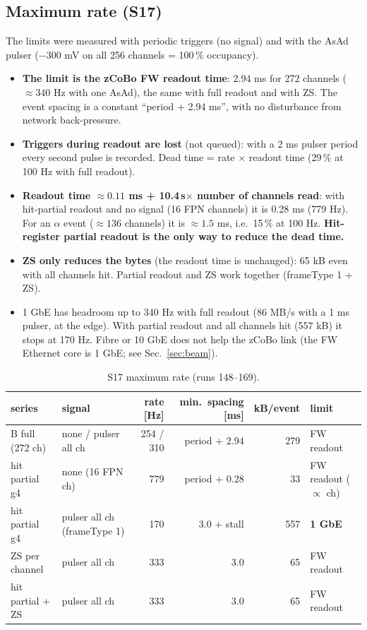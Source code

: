 \documentclass[a4paper,11pt]{article}
\newcommand{\us}{\,\textmu s}
\begin{document}
\subsection{Maximum rate (S17)}
The limits were measured with periodic triggers (no signal) and with the AsAd pulser ($-300$ mV on all 256 channels = 100\,\% occupancy).
\begin{itemize}
\item \textbf{The limit is the zCoBo FW readout time}: 2.94 ms for 272 channels ($\approx 340$ Hz with one AsAd), the same with full readout and with ZS. The event spacing is a constant ``period + 2.94 ms'', with no disturbance from network back-pressure.
\item \textbf{Triggers during readout are lost} (not queued): with a 2 ms pulser period every second pulse is recorded. Dead time = rate $\times$ readout time (29\,\% at 100 Hz with full readout).
\item \textbf{Readout time $\approx 0.11$ ms + 10.4\us $\times$ number of channels read}: with hit-partial readout and no signal (16 FPN channels) it is 0.28 ms (779 Hz). For an $\alpha$ event ($\approx 136$ channels) it is $\approx 1.5$ ms, i.e.\ 15\,\% at 100 Hz. \textbf{Hit-register partial readout is the only way to reduce the dead time.}
\item \textbf{ZS only reduces the bytes} (the readout time is unchanged): 65 kB even with all channels hit. Partial readout and ZS work together (frameType 1 + ZS).
\item 1 GbE has headroom up to 340 Hz with full readout (86 MB/s with a 1 ms pulser, at the edge). With partial readout and all channels hit (557 kB) it stops at 170 Hz. Fibre or 10 GbE does not help the zCoBo link (the FW Ethernet core is 1 GbE; see Sec.~\ref{sec:beam}).
\end{itemize}

\begin{table}[h]\centering\small
\caption{S17 maximum rate (runs 148--169).}
\footnotesize
\begin{tabular}{llrrrl}
\toprule
series & signal & rate [Hz] & min.\ spacing [ms] & kB/event & limit \\
\midrule
B full (272 ch) & none / pulser all ch & 254 / 310 & period + 2.94 & 279 & FW readout \\
hit partial g4 & none (16 FPN ch) & 779 & period + 0.28 & 33 & FW readout ($\propto$ ch) \\
hit partial g4 & pulser all ch (frameType 1) & 170 & 3.0 + stall & 557 & \textbf{1 GbE} \\
ZS per channel & pulser all ch & 333 & 3.0 & 65 & FW readout \\
hit partial + ZS & pulser all ch & 333 & 3.0 & 65 & FW readout \\
\bottomrule
\end{tabular}
\end{table}
\end{document}
